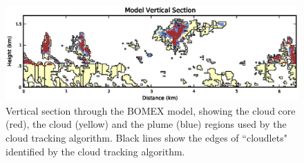 \documentclass[acp]{copernicus}
\begin{document}
















\begin{figure}[t]
\vspace*{2mm}
\begin{center}
\includegraphics[width=\textwidth]{./figures/vertical_section}
\end{center}
\caption{Vertical section through the BOMEX model, showing the cloud core
(red), the cloud (yellow) and the plume (blue) regions used by the cloud 
tracking algorithm. Black lines show the edges of ``cloudlets" identified by 
the cloud tracking algorithm.}
\label{fig:vertical_section}
\end{figure}
\end{document}
